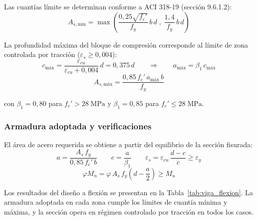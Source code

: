 Las cuantías límite se determinan conforme a ACI 318-19 (sección 9.6.1.2):
\begin{equation}
    A_{s,\text{mín}} = \max\!\left(\frac{0{,}25\sqrt{f_c'}}{f_y}\,b\,d\;,\;\frac{1{,}4}{f_y}\,b\,d\right)
\end{equation}
 
La profundidad máxima del bloque de compresión corresponde al límite de zona controlada por
tracción ($\varepsilon_s \geq 0{,}004$):
\begin{equation}
    c_{\text{máx}} = \frac{\varepsilon_{cu}}{\varepsilon_{cu} + 0{,}004}\,d = 0{,}375\,d
    \qquad \Rightarrow \qquad
    a_{\text{máx}} = \beta_1\,c_{\text{máx}}
\end{equation}
\begin{equation}
    A_{s,\text{máx}} = \frac{0{,}85\,f_c'\,a_{\text{máx}}\,b}{f_y}
\end{equation}
 
con $\beta_1 = 0{,}80$ para $f_c' > 28\;\text{MPa}$ y $\beta_1 = 0{,}85$ para $f_c' \leq 28\;\text{MPa}$.
 
\subsubsection{Armadura adoptada y verificaciones}
 
El área de acero requerida se obtiene a partir del equilibrio de la sección fisurada:
\begin{equation}
    a = \frac{A_s\,f_y}{0{,}85\,f_c'\,b}
    \qquad
    c = \frac{a}{\beta_1}
    \qquad
    \varepsilon_s = \varepsilon_{cu}\,\frac{d - c}{c} \geq \varepsilon_y
\end{equation}
\begin{equation}
    \varphi M_n = \varphi\,A_s\,f_y\!\left(d - \frac{a}{2}\right) \geq M_u
\end{equation}
 
Los resultados del diseño a flexión se presentan en la Tabla~\ref{tab:viga_flexion}. La armadura
adoptada en cada zona cumple los límites de cuantía mínima y máxima, y la sección opera en
régimen controlado por tracción en todos los casos.
 

